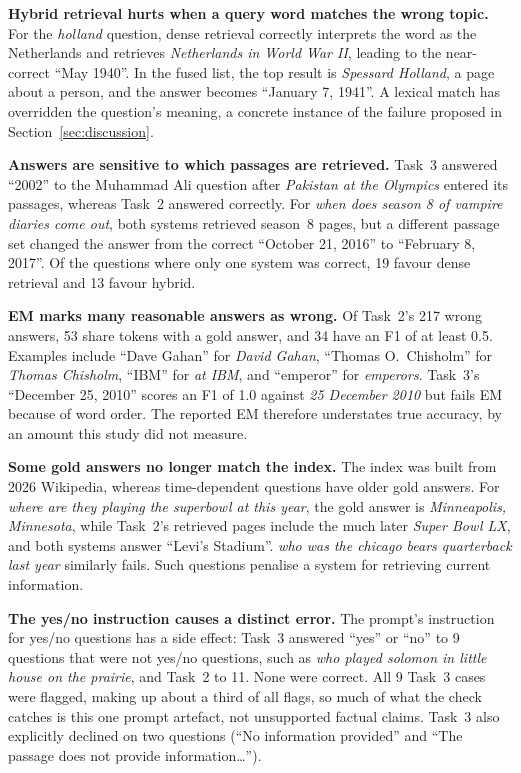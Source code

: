 \documentclass[11pt,a4paper]{article}
\begin{document}
\textbf{Hybrid retrieval hurts when a query word matches the wrong topic.} For the \emph{holland} question, dense retrieval correctly interprets the word as the Netherlands and retrieves \emph{Netherlands in World War II}, leading to the near-correct ``May 1940''. In the fused list, the top result is \emph{Spessard Holland}, a page about a person, and the answer becomes ``January 7, 1941''. A lexical match has overridden the question's meaning, a concrete instance of the failure proposed in Section~\ref{sec:discussion}.

\textbf{Answers are sensitive to which passages are retrieved.} Task~3 answered ``2002'' to the Muhammad Ali question after \emph{Pakistan at the Olympics} entered its passages, whereas Task~2 answered correctly. For \emph{when does season 8 of vampire diaries come out}, both systems retrieved season~8 pages, but a different passage set changed the answer from the correct ``October 21, 2016'' to ``February 8, 2017''. Of the questions where only one system was correct, 19 favour dense retrieval and 13 favour hybrid.

\textbf{EM marks many reasonable answers as wrong.} Of Task~2's 217 wrong answers, 53 share tokens with a gold answer, and 34 have an F1 of at least 0.5. Examples include ``Dave Gahan'' for \emph{David Gahan}, ``Thomas O.\ Chisholm'' for \emph{Thomas Chisholm}, ``IBM'' for \emph{at IBM}, and ``emperor'' for \emph{emperors}. Task~3's ``December 25, 2010'' scores an F1 of 1.0 against \emph{25 December 2010} but fails EM because of word order. The reported EM therefore understates true accuracy, by an amount this study did not measure.

\textbf{Some gold answers no longer match the index.} The index was built from 2026 Wikipedia, whereas time-dependent questions have older gold answers. For \emph{where are they playing the superbowl at this year}, the gold answer is \emph{Minneapolis, Minnesota}, while Task~2's retrieved pages include the much later \emph{Super Bowl LX}, and both systems answer ``Levi's Stadium''. \emph{who was the chicago bears quarterback last year} similarly fails. Such questions penalise a system for retrieving current information.

\textbf{The yes/no instruction causes a distinct error.} The prompt's instruction for yes/no questions has a side effect: Task~3 answered ``yes'' or ``no'' to 9 questions that were not yes/no questions, such as \emph{who played solomon in little house on the prairie}, and Task~2 to 11. None were correct. All 9 Task~3 cases were flagged, making up about a third of all flags, so much of what the check catches is this one prompt artefact, not unsupported factual claims. Task~3 also explicitly declined on two questions (``No information provided'' and ``The passage does not provide information\ldots'').
\end{document}
